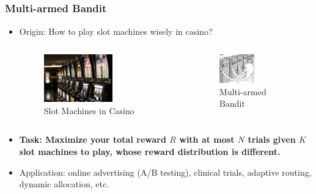 \documentclass[compress]{beamer}
\begin{document}
\subsection{}
\begin{frame}
\frametitle{Multi-armed Bandit}
\begin{itemize}
  \item Origin: How to play slot machines wisely in casino?
       \begin{columns}
        \begin{figure}[htb!]
          \centering
          \includegraphics[width=0.6\textwidth]{casino.pdf}
          \caption{\label{fig:casino} Slot Machines in Casino}
        \end{figure}
        \begin{figure}[htb!]
          \centering
          \includegraphics[width=0.5\textwidth]{mab.pdf}
          \caption{\label{fig:mab} Multi-armed Bandit}
        \end{figure}       
      \end{columns}
  \item \textbf{Task: Maximize your total reward $R$ with at most $N$ trials given $K$ slot machines to play, whose reward distribution is different.}
  \item Application: online advertising (A/B testing), clinical trials, adaptive routing, dynamic allocation, etc.
\end{itemize}
\end{frame}
\end{document}
